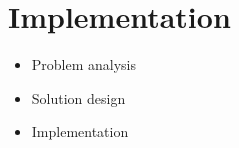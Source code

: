 \chapter{Implementation}
\label{chap:implementation}


\begin{itemize}
  \item Problem analysis
  \item Solution design
  \item Implementation
\end{itemize}

